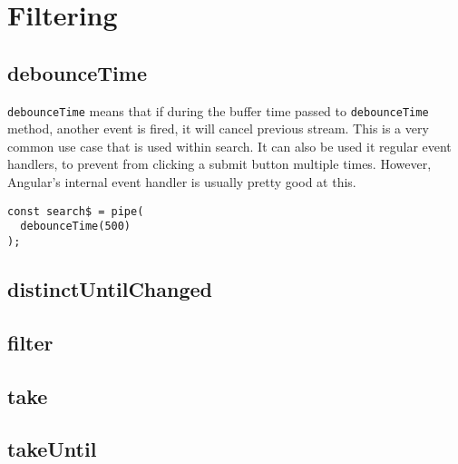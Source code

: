 \chapter{Filtering}

\section{debounceTime}
\lstinline{debounceTime} means that if during the buffer time passed to 
\lstinline{debounceTime} method, another event is fired, it will cancel 
previous stream. This is a very common use case that is used within search.
It can also be used it regular event handlers, to prevent from clicking a 
submit button multiple times. However, Angular's internal event handler 
is usually pretty good at this. 

\begin{lstlisting}[caption=blog-search.component.ts]
const search$ = pipe(
  debounceTime(500)
);
\end{lstlisting}

\section{distinctUntilChanged} 

\section{filter} 

\section{take} 

\section{takeUntil}